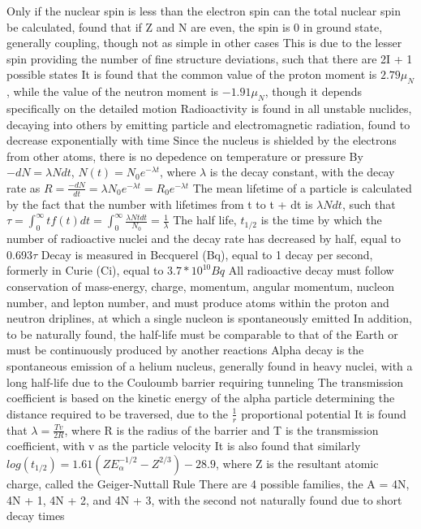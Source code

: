 \documentclass[11 pt, twoside]{article}
\newenvironment{outline*}
{
	\begin{outline}[enumerate]
	}
	{\end{outline}
}
\begin{document}
\begin{outline*}
	\2 Only if the nuclear spin is less than the electron spin can the total nuclear spin be calculated, found that if Z and N are even, the spin is 0 in ground state, generally coupling, though not as simple in other cases
		\3 This is due to the lesser spin providing the number of fine structure deviations, such that there are 2I + 1 possible states
	\2 It is found that the common value of the proton moment is $2.79 \mu_N$, while the value of the neutron moment is $-1.91 \mu_N$, though it depends specifically on the detailed motion
\1 Radioactivity is found in all unstable nuclides, decaying into others by emitting particle and electromagnetic radiation, found to decrease exponentially with time
	\2 Since the nucleus is shielded by the electrons from other atoms, there is no depedence on temperature or pressure 
	\2 By $-dN = \lambda N dt$, $N(t) = N_0e^{-\lambda t}$, where $\lambda$ is the decay constant, with the decay rate as $R = \frac{-dN}{dt} = \lambda N_0e^{-\lambda t} = R_0e^{-\lambda t}$
		\3 The mean lifetime of a particle is calculated by the fact that the number with lifetimes from t to t + dt is $\lambda N dt$, such that $\tau = \int^{\infty}_0 t f(t)dt = \int^{\infty}_0 \frac{\lambda N t dt}{N_0} = \frac{1}{\lambda}$
		\3 The half life, $t_{1/2}$ is the time by which the number of radioactive nuclei and the decay rate has decreased by half, equal to 0.693$\tau$
	\2 Decay is measured in Becquerel (Bq), equal to 1 decay per second, formerly in Curie (Ci), equal to $3.7 * 10^10 Bq$
	\2 All radioactive decay must follow conservation of mass-energy, charge, momentum, angular momentum, nucleon number, and lepton number, and must produce atoms within the proton and neutron driplines, at which a single nucleon is spontaneously emitted
		\3 In addition, to be naturally found, the half-life must be comparable to that of the Earth or must be continuously produced by another reactions
	\2 Alpha decay is the spontaneous emission of a helium nucleus, generally found in heavy nuclei, with a long half-life due to the Couloumb barrier requiring tunneling
		\3 The transmission coefficient is based on the kinetic energy of the alpha particle determining the distance required to be traversed, due to the $\frac{1}{r}$ proportional potential
		\3 It is found that $\lambda = \frac{Tv}{2R}$, where R is the radius of the barrier and T is the transmission coefficient, with v as the particle velocity
			\4 It is also found that similarly $log(t_{1/2}) = 1.61(ZE_{\alpha}^{-1/2} - Z^{2/3}) - 28.9$, where Z is the resultant atomic charge, called the Geiger-Nuttall Rule
		\3 There are 4 possible families, the A = 4N, 4N + 1, 4N + 2, and 4N + 3, with the second not naturally found due to short decay times

\end{outline*}
\end{document}
